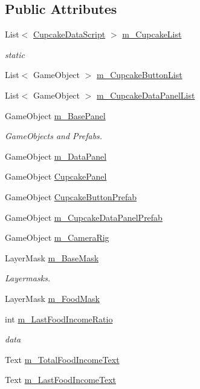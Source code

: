 \subsection*{Public Attributes}
\begin{DoxyCompactItemize}
\item 
List$<$ \mbox{\hyperlink{class_cupcake_data_script}{Cupcake\+Data\+Script}} $>$ \mbox{\hyperlink{class_base_script_a3a9df547068803cb45011c56477d91a5}{m\+\_\+\+Cupcake\+List}}
\begin{DoxyCompactList}\small\item\em static \end{DoxyCompactList}\item 
List$<$ Game\+Object $>$ \mbox{\hyperlink{class_base_script_aeed1a4a9caae424bd19d846d29a53b6d}{m\+\_\+\+Cupcake\+Button\+List}}
\item 
List$<$ Game\+Object $>$ \mbox{\hyperlink{class_base_script_ab9ba1c934e9a424727e7377deae6e2b7}{m\+\_\+\+Cupcake\+Data\+Panel\+List}}
\item 
Game\+Object \mbox{\hyperlink{class_base_script_ac6b0c65d289e77db6ba1e606f921f125}{m\+\_\+\+Base\+Panel}}
\begin{DoxyCompactList}\small\item\em Game\+Objects and Prefabs. \end{DoxyCompactList}\item 
Game\+Object \mbox{\hyperlink{class_base_script_a84c794227556e2884f970195ce3f8f74}{m\+\_\+\+Data\+Panel}}
\item 
Game\+Object \mbox{\hyperlink{class_base_script_ae279ed36d31b9ac71038d7e313c7caca}{Cupcake\+Panel}}
\item 
Game\+Object \mbox{\hyperlink{class_base_script_a1797c946833f91ab439481fad010bd40}{Cupcake\+Button\+Prefab}}
\item 
Game\+Object \mbox{\hyperlink{class_base_script_a88cfff6f1fe4276b06de9bab9d027f1c}{m\+\_\+\+Cupcake\+Data\+Panel\+Prefab}}
\item 
Game\+Object \mbox{\hyperlink{class_base_script_a1361abedf3e70a2ef27078f0e35807b9}{m\+\_\+\+Camera\+Rig}}
\item 
Layer\+Mask \mbox{\hyperlink{class_base_script_a65ee952a3856a4476413c77463dc67ae}{m\+\_\+\+Base\+Mask}}
\begin{DoxyCompactList}\small\item\em Layermasks. \end{DoxyCompactList}\item 
Layer\+Mask \mbox{\hyperlink{class_base_script_a29dc6e8ee0fa22c787528c170e18f742}{m\+\_\+\+Food\+Mask}}
\item 
int \mbox{\hyperlink{class_base_script_a23c6452985dcf659f99138cd0a3149d2}{m\+\_\+\+Last\+Food\+Income\+Ratio}}
\begin{DoxyCompactList}\small\item\em data \end{DoxyCompactList}\item 
Text \mbox{\hyperlink{class_base_script_ab463c1146298cbf111dd9fe29722aaa0}{m\+\_\+\+Total\+Food\+Income\+Text}}
\item 
Text \mbox{\hyperlink{class_base_script_a9419c1f90813272da7e7d5e971fe63c2}{m\+\_\+\+Last\+Food\+Income\+Text}}
\end{DoxyCompactItemize}
